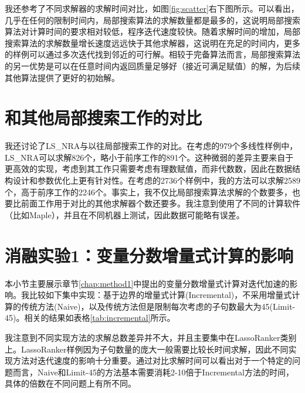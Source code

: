 我还参考了不同求解器的求解时间对比，如图\ref{fig:scatter}右下图所示。可以看出，几乎在任何的限制时间内，局部搜索算法的求解数量都是最多的，这说明局部搜索算法对计算时间的要求相对较低，程序迭代速度较快。随着求解时间的增加，局部搜索算法的求解数量增长速度远远快于其他求解器，这说明在充足的时间内，更多的样例可以通过多次迭代找到邻近的可行解。相较于完备算法而言，局部搜索算法的另一优势是可以在任意时间内返回质量足够好（接近可满足赋值）的解，为后续其他算法提供了更好的初始解。



\section{和其他局部搜索工作的对比}
我还讨论了LS\_NRA与以往局部搜索工作的对比。在\cite{multilinear}考虑的979个多线性样例中，LS\_NRA可以求解826个，略小于前序工作的891个。这种微弱的差异主要来自于\cite{multilinear}更高效的实现，考虑到其工作只需要考虑有理数赋值，而非代数数，因此在数据结构设计和参数优化上更有针对性。在\cite{LiXZ23}考虑的2736个样例中，我的方法可以求解2589个，高于前序工作的2246个。事实上，我不仅比局部搜索算法求解的个数要多，也要比前面工作用于对比的其他求解器个数还要多。我注意到\cite{LiXZ23}使用了不同的计算软件（比如Maple），并且在不同机器上测试，因此数据可能略有误差。


\section{消融实验1：变量分数增量式计算的影响}
本小节主要展示章节\ref{chap:method1}中提出的变量分数增量式计算对迭代加速的影响。我比较如下集中实现：基于边界的增量式计算(Incremental)，不采用增量式计算的传统方法(Naive)，以及传统方法但是限制每次考虑的子句数最大为45(Limit-45)。相关的结果如表格\ref{tab:incremental}所示。

我注意到不同实现方法的求解总数差异并不大，并且主要集中在LassoRanker类别上。LassoRanker样例因为子句数量的庞大一般需要比较长时间求解，因此不同实现方法对迭代速度的影响十分重要。通过对比求解时间可以看出对于一个特定的问题而言，Naive和Limit-45的方法基本需要消耗2-10倍于Incremental方法的时间，具体的倍数在不同问题上有所不同。


